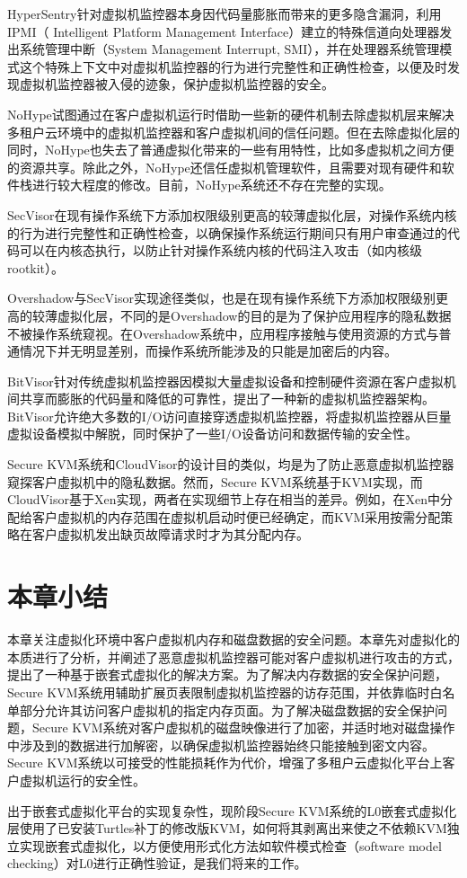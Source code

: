 HyperSentry针对虚拟机监控器本身因代码量膨胀而带来的更多隐含漏洞，利用IPMI（ Intelligent Platform Management Interface）建立的特殊信道向处理器发出系统管理中断（System Management Interrupt, SMI），并在处理器系统管理模式这个特殊上下文中对虚拟机监控器的行为进行完整性和正确性检查，以便及时发现虚拟机监控器被入侵的迹象，保护虚拟机监控器的安全。

NoHype试图通过在客户虚拟机运行时借助一些新的硬件机制去除虚拟机层来解决多租户云环境中的虚拟机监控器和客户虚拟机间的信任问题。但在去除虚拟化层的同时，NoHype也失去了普通虚拟化带来的一些有用特性，比如多虚拟机之间方便的资源共享。除此之外，NoHype还信任虚拟机管理软件，且需要对现有硬件和软件栈进行较大程度的修改。目前，NoHype系统还不存在完整的实现。

SecVisor在现有操作系统下方添加权限级别更高的较薄虚拟化层，对操作系统内核的行为进行完整性和正确性检查，以确保操作系统运行期间只有用户审查通过的代码可以在内核态执行，以防止针对操作系统内核的代码注入攻击（如内核级rootkit）。

Overshadow与SecVisor实现途径类似，也是在现有操作系统下方添加权限级别更高的较薄虚拟化层，不同的是Overshadow的目的是为了保护应用程序的隐私数据不被操作系统窥视。在Overshadow系统中，应用程序接触与使用资源的方式与普通情况下并无明显差别，而操作系统所能涉及的只能是加密后的内容。

BitVisor针对传统虚拟机监控器因模拟大量虚拟设备和控制硬件资源在客户虚拟机间共享而膨胀的代码量和降低的可靠性，提出了一种新的虚拟机监控器架构。BitVisor允许绝大多数的I/O访问直接穿透虚拟机监控器，将虚拟机监控器从巨量虚拟设备模拟中解脱，同时保护了一些I/O设备访问和数据传输的安全性。

Secure KVM系统和CloudVisor的设计目的类似，均是为了防止恶意虚拟机监控器窥探客户虚拟机中的隐私数据。然而，Secure KVM系统基于KVM实现，而CloudVisor基于Xen实现，两者在实现细节上存在相当的差异。例如，在Xen中分配给客户虚拟机的内存范围在虚拟机启动时便已经确定，而KVM采用按需分配策略在客户虚拟机发出缺页故障请求时才为其分配内存。

\section{本章小结}

本章关注虚拟化环境中客户虚拟机内存和磁盘数据的安全问题。本章先对虚拟化的本质进行了分析，并阐述了恶意虚拟机监控器可能对客户虚拟机进行攻击的方式，提出了一种基于嵌套式虚拟化的解决方案。为了解决内存数据的安全保护问题，Secure KVM系统用辅助扩展页表限制虚拟机监控器的访存范围，并依靠临时白名单部分允许其访问客户虚拟机的指定内存页面。为了解决磁盘数据的安全保护问题，Secure KVM系统对客户虚拟机的磁盘映像进行了加密，并适时地对磁盘操作中涉及到的数据进行加解密，以确保虚拟机监控器始终只能接触到密文内容。Secure KVM系统以可接受的性能损耗作为代价，增强了多租户云虚拟化平台上客户虚拟机运行的安全性。

出于嵌套式虚拟化平台的实现复杂性，现阶段Secure KVM系统的L0嵌套式虚拟化层使用了已安装Turtles补丁的修改版KVM，如何将其剥离出来使之不依赖KVM独立实现嵌套式虚拟化，以方便使用形式化方法如软件模式检查（software model checking）对L0进行正确性验证，是我们将来的工作。